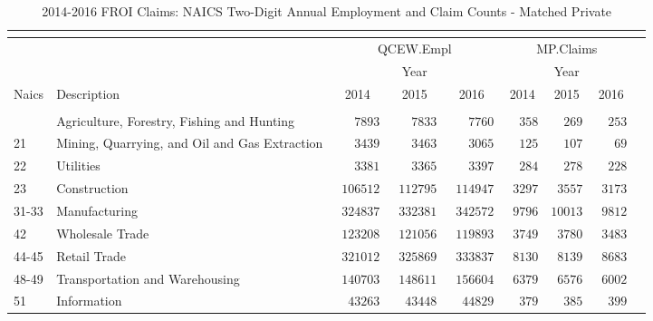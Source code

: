 \documentclass[9pt, oneside]{article}   	%
\begin{document}
\begin{longtable}{lp{3 in}ccccccc}

\caption{2014-2016 FROI Claims: NAICS Two-Digit Annual Employment  and Claim Counts - Matched Private}\\ 
\label{Table: 10a.MPa}\\
\hline
                          \toprule
 &  & \multicolumn{3}{c}{QCEW.Empl} & \multicolumn{3}{c}{MP.Claims} \\ 
 &  & \multicolumn{3}{c}{Year} & \multicolumn{3}{c}{Year} \\ 
Naics  & Description & 2014 & 2015 & 2016 & 2014 & 2015 & \multicolumn{1}{c}{2016} \\ 
\midrule\\ [-1\normalbaselineskip]\hline\endhead\hline\endfoot
11  & Agriculture, Forestry, Fishing and Hunting & $\phantom{000}7893$ & $\phantom{000}7833$ & $\phantom{000}7760$ & $\phantom{00}358$ & $\phantom{00}269$ & $\phantom{00}253$ \\
21  & Mining, Quarrying, and Oil and Gas Extraction & $\phantom{000}3439$ & $\phantom{000}3463$ & $\phantom{000}3065$ & $\phantom{00}125$ & $\phantom{00}107$ & $\phantom{000}69$ \\
22  & Utilities & $\phantom{000}3381$ & $\phantom{000}3365$ & $\phantom{000}3397$ & $\phantom{00}284$ & $\phantom{00}278$ & $\phantom{00}228$ \\
23  & Construction & $\phantom{0}106512$ & $\phantom{0}112795$ & $\phantom{0}114947$ & $\phantom{0}3297$ & $\phantom{0}3557$ & $\phantom{0}3173$ \\
31-33  & Manufacturing & $\phantom{0}324837$ & $\phantom{0}332381$ & $\phantom{0}342572$ & $\phantom{0}9796$ & $10013$ & $\phantom{0}9812$ \\
42  & Wholesale Trade & $\phantom{0}123208$ & $\phantom{0}121056$ & $\phantom{0}119893$ & $\phantom{0}3749$ & $\phantom{0}3780$ & $\phantom{0}3483$ \\
44-45  & Retail Trade & $\phantom{0}321012$ & $\phantom{0}325869$ & $\phantom{0}333837$ & $\phantom{0}8130$ & $\phantom{0}8139$ & $\phantom{0}8683$ \\
48-49  & Transportation and Warehousing & $\phantom{0}140703$ & $\phantom{0}148611$ & $\phantom{0}156604$ & $\phantom{0}6379$ & $\phantom{0}6576$ & $\phantom{0}6002$ \\
51  & Information & $\phantom{00}43263$ & $\phantom{00}43448$ & $\phantom{00}44829$ & $\phantom{00}379$ & $\phantom{00}385$ & $\phantom{00}399$ \\

\end{longtable}
\end{document}
